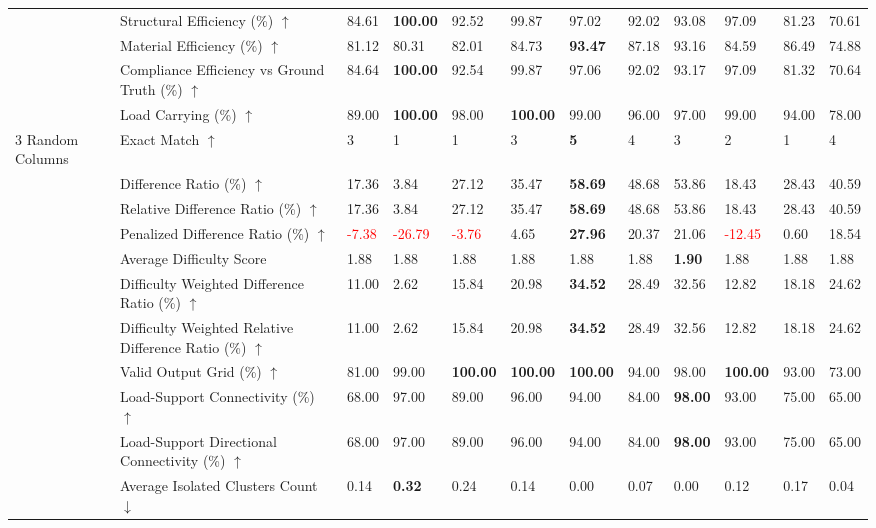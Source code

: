 \begin{table}[!h]
{\begin{tabular}{llllllllllll}
 & Structural Efficiency (\%) $\uparrow$ & 84.61 & \textbf{100.00} & 92.52 & 99.87 & 97.02 & 92.02 & 93.08 & 97.09 & 81.23 & 70.61 \\
 & Material Efficiency (\%) $\uparrow$ & 81.12 & 80.31 & 82.01 & 84.73 & \textbf{93.47} & 87.18 & 93.16 & 84.59 & 86.49 & 74.88 \\
 & Compliance Efficiency vs Ground Truth (\%) $\uparrow$ & 84.64 & \textbf{100.00} & 92.54 & 99.87 & 97.06 & 92.02 & 93.17 & 97.09 & 81.32 & 70.64 \\
 & Load Carrying (\%) $\uparrow$ & 89.00 & \textbf{100.00} & 98.00 & \textbf{100.00} & 99.00 & 96.00 & 97.00 & 99.00 & 94.00 & 78.00 \\
3 Random Columns & Exact Match $\uparrow$ & 3 & 1 & 1 & 3 & \textbf{5} & 4 & 3 & 2 & 1 & 4 \\
 & Difference Ratio (\%) $\uparrow$ & 17.36 & 3.84 & 27.12 & 35.47 & \textbf{58.69} & 48.68 & 53.86 & 18.43 & 28.43 & 40.59 \\
 & Relative Difference Ratio (\%) $\uparrow$ & 17.36 & 3.84 & 27.12 & 35.47 & \textbf{58.69} & 48.68 & 53.86 & 18.43 & 28.43 & 40.59 \\
 & Penalized Difference Ratio (\%) $\uparrow$ & \textcolor{red}{-7.38} & \textcolor{red}{-26.79} & \textcolor{red}{-3.76} & 4.65 & \textbf{27.96} & 20.37 & 21.06 & \textcolor{red}{-12.45} & 0.60 & 18.54 \\
 & Average Difficulty Score & 1.88 & 1.88 & 1.88 & 1.88 & 1.88 & 1.88 & \textbf{1.90} & 1.88 & 1.88 & 1.88 \\
 & Difficulty Weighted Difference Ratio (\%) $\uparrow$ & 11.00 & 2.62 & 15.84 & 20.98 & \textbf{34.52} & 28.49 & 32.56 & 12.82 & 18.18 & 24.62 \\
 & Difficulty Weighted Relative Difference Ratio (\%) $\uparrow$ & 11.00 & 2.62 & 15.84 & 20.98 & \textbf{34.52} & 28.49 & 32.56 & 12.82 & 18.18 & 24.62 \\
 & Valid Output Grid (\%) $\uparrow$ & 81.00 & 99.00 & \textbf{100.00} & \textbf{100.00} & \textbf{100.00} & 94.00 & 98.00 & \textbf{100.00} & 93.00 & 73.00 \\
 & Load-Support Connectivity (\%) $\uparrow$ & 68.00 & 97.00 & 89.00 & 96.00 & 94.00 & 84.00 & \textbf{98.00} & 93.00 & 75.00 & 65.00 \\
 & Load-Support Directional Connectivity (\%) $\uparrow$ & 68.00 & 97.00 & 89.00 & 96.00 & 94.00 & 84.00 & \textbf{98.00} & 93.00 & 75.00 & 65.00 \\
 & Average Isolated Clusters Count $\downarrow$ & 0.14 & \textbf{0.32} & 0.24 & 0.14 & 0.00 & 0.07 & 0.00 & 0.12 & 0.17 & 0.04 \\

\end{tabular}}
\end{table}
